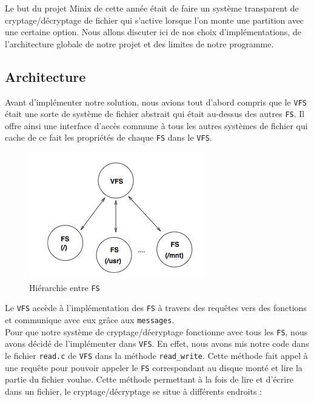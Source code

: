 \documentclass[10pt, onecolumn] {IEEEtran}
\begin{document}
Le but du projet Minix de cette année était de faire un système transparent de cryptage/décryptage de fichier qui s'active lorsque l'on monte une partition avec une certaine option. Nous allons discuter ici de nos choix d'implémentations, de l'architecture globale de notre projet et des limites de notre programme.\\   

\subsection{Architecture}

Avant d'implémenter notre solution, nous avions tout d'abord compris que le \texttt{VFS} était une sorte de système de fichier abstrait qui était au-dessus des autres \texttt{FS}. Il offre ainsi une interface d'accès commune à tous les autres systèmes de fichier qui cache de ce fait les propriétés de chaque \texttt{FS} dans le \texttt{VFS}. 

\begin{figure}[h]
\begin{center}
\includegraphics [scale=0.5] {figures/VFS-FS.png} 
\caption{Hiérarchie entre \texttt{FS}}
\label{default}
\end{center}
\end{figure}
     
Le \texttt{VFS} accède à l'implémentation des \texttt{FS} à travers des requêtes vers des fonctions et communique avec eux grâce aux \texttt{messages}. \\

Pour que notre système de cryptage/décryptage fonctionne avec tous les \texttt{FS}, nous avons décidé de l'implémenter dans \texttt{VFS}. En effet, nous avons mis notre code dans le fichier \texttt{read.c} de \texttt{VFS} dans la méthode \texttt{read\_write}. Cette méthode fait appel à une requête pour pouvoir appeler le  \texttt{FS} correspondant au disque monté et lire la partie du fichier voulue. Cette méthode permettant à la fois de lire et d'écrire dans un fichier, le cryptage/décryptage se situe à différents endroits :
\end{document}

